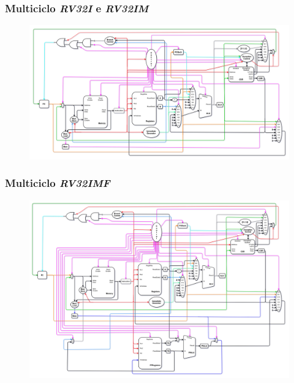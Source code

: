 \documentclass[aspectratio=169]{beamer}
\begin{document}
    \begin{frame}
        \frametitle{Multiciclo \textit{RV32I} e \textit{RV32IM}}
        \vfill
        \begin{figure}[H]
        \centering
            \includegraphics[width=.95\textwidth,height=.9\textheight,keepaspectratio]{../images/uarch_diagrams/multicycle-RV32I-RV32IM.png}
        \end{figure}
        \vfill
    \end{frame}

    \begin{frame}
        \frametitle{Multiciclo \textit{RV32IMF}}
        \vfill
        \begin{figure}[H]
        \centering
            \includegraphics[width=.9\textwidth,height=.85\textheight,keepaspectratio]{../images/uarch_diagrams/multicycle-RV32IMF.png}
        \end{figure}
        \vfill
    \end{frame}
\end{document}
